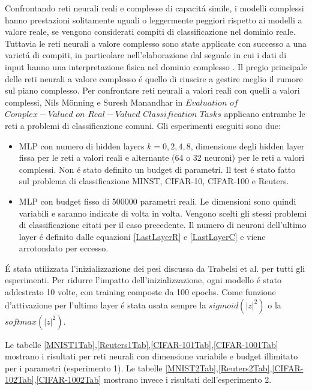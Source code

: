 \documentclass[a4paper,10pt]{article}
\begin{document}
 
 Confrontando reti neurali reali e complesse di capacit\'a simile, i modelli complessi hanno prestazioni solitamente uguali o leggermente peggiori rispetto ai modelli a valore reale, se vengono considerati compiti di classificazione nel dominio reale. Tuttavia le reti neurali a valore complesso sono state applicate con successo a una variet\'a di compiti, in particolare nell'elaborazione dal segnale in cui i dati di input hanno una interpretazione fisica nel dominio complesso\cite{birx1993complex} \cite{sawada2003polar} \cite{yamaki2008singular} \cite{hirose2009complex} \cite{guberman2016complex} \cite{trabelsi2017deep}. Il pregio principale delle reti neurali a valore complesso \'e quello di riuscire a gestire meglio il rumore sul piano complesso.
 Per confrontare reti neurali a valori reali con quelli a valori complessi, Nils M\"onning e Suresh Manandhar in $Evaluation$ $of$ $Complex-Valued$ $on$ $Real-Valued$ $Classification$ $Tasks$  \cite{monning2018evaluation} applicano entrambe le reti a problemi di classificazione comuni. Gli esperimenti eseguiti sono due:
 \begin{itemize}
  \item MLP con numero di hidden layers $k = 0, 2, 4, 8$, dimensione degli hidden layer fissa per le reti a valori reali e alternante (64 o 32 neuroni) per le reti a valori complessi. Non \'e stato definito un budget di parametri. Il test \'e stato fatto sul problema di classificazione MINST, CIFAR-10, CIFAR-100 e Reuters. 
  \item MLP con budget fisso di 500000 parametri reali. Le dimensioni sono quindi variabili e saranno indicate di volta in volta. Vengono scelti gli stessi problemi di classificazione citati per il caso precedente. Il numero di neuroni dell'ultimo layer \'e definito dalle equazioni \ref{LastLayerR} e \ref{LastLayerC} e viene arrotondato per eccesso.
 \end{itemize}
 
 \'E stata utilizzata l'inizializzazione dei pesi discussa da Trabelsi et al. \cite{trabelsi2017deep} per tutti gli esperimenti. Per ridurre l'impatto dell'inizializzazione, ogni modello \'e stato addestrato 10 volte, con training composte da 100 epochs. Come funzione d'attivazione per l'ultimo layer \'e stata usata sempre la $sigmoid(|z|^2)$ o la $softmax(|z|^2)$.
  
 Le tabelle \ref{MNIST1Tab},\ref{Reuters1Tab},\ref{CIFAR-101Tab},\ref{CIFAR-1001Tab} mostrano i risultati per reti neurali con dimensione variabile e budget illimitato per i parametri (esperimento 1). Le tabelle \ref{MNIST2Tab},\ref{Reuters2Tab},\ref{CIFAR-102Tab},\ref{CIFAR-1002Tab} mostrano invece i risultati dell'esperimento 2.
 
\end{document}
